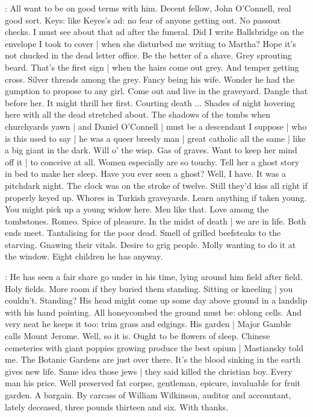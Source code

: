 \BloomInt:
All want to be on good terms with him.
Decent fellow, John O'Connell, real good sort.
Keys:
like Keyes's ad:
no fear of anyone getting out.
No passout checks.
I must see about that ad after the funeral.
Did I write Ballsbridge on the envelope I took to cover |
when she disturbed me writing to Martha?
Hope it's not chucked in the dead letter office.
Be the better of a shave.
Grey sprouting beard.
That's the first sign |
when the hairs come out grey.
And temper getting cross.
Silver threads among the grey.
Fancy being his wife.
Wonder he had the gumption to propose to any girl.
Come out and live in the graveyard.
Dangle that before her.
It might thrill her first.
Courting death ...
Shades of night hovering here with all the dead stretched about.
The shadows of the tombs when churchyards yawn |
and Daniel O'Connell |
must be a descendant I suppose |
who is this used to say |
he was a queer breedy man |
great catholic all the same |
like a big giant in the dark.
Will o' the wisp.
Gas of graves.
Want to keep her mind off it |
to conceive at all.
Women especially are so touchy.
Tell her a ghost story in bed to make her sleep.
Have you ever seen a ghost?
Well, I have.
It was a pitchdark night.
The clock was on the stroke of twelve.
Still they'd kiss all right if properly keyed up.
Whores in Turkish graveyards.
Learn anything if taken young.
You might pick up a young widow here.
Men like that.
Love among the tombstones.
Romeo.
Spice of pleasure.
In the midst of death |
we are in life.
Both ends meet.
Tantalising for the poor dead.
Smell of grilled beefsteaks to the starving.
Gnawing their vitals.
Desire to grig people.
Molly wanting to do it at the window.
Eight children he has anyway.

\BloomInt:
He has seen a fair share go under in his time,
lying around him field after field.
Holy fields.
More room if they buried them standing.
Sitting or kneeling |
you couldn't.
Standing?
His head might come up some day above ground in a landslip with his hand pointing.
All honeycombed the ground must be:
oblong cells.
And very neat he keeps it too:
trim grass and edgings.
His garden |
Major Gamble calls Mount Jerome.
Well, so it is.
Ought to be flowers of sleep.
Chinese cemeteries with giant poppies growing produce the best opium |
Mastiansky told me.
The Botanic Gardens are just over there.
It's the blood sinking in the earth gives new life.
Same idea those jews |
they said killed the christian boy.
Every man his price.
Well preserved fat corpse, gentleman, epicure,
invaluable for fruit garden.
A bargain.
By carcass of William Wilkinson,
auditor and accountant, lately deceased,
three pounds thirteen and six.
With thanks.

